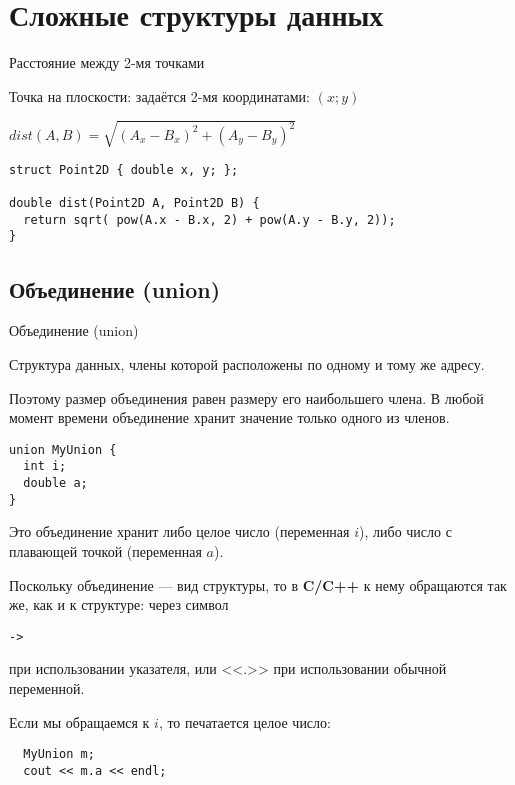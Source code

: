 \section{Сложные структуры данных}

\begin{frame}[t,fragile]{Расстояние между 2-мя точками}

Точка на плоскости: задаётся 2-мя координатами: $(x; y)$

$dist(A, B) = \sqrt{{(A_x - B_x)^2} + {(A_y - B_y)^2}}$

\begin{lstlisting}
struct Point2D { double x, y; };

double dist(Point2D A, Point2D B) {
  return sqrt( pow(A.x - B.x, 2) + pow(A.y - B.y, 2));
}
\end{lstlisting}
\end{frame}

\subsection{Объединение (union)}

\begin{frame}[t,fragile]{Объединение (union)}

Структура данных, 
члены которой расположены по одному и тому же адресу.
 
Поэтому размер объединения равен размеру его наибольшего члена. 
В любой момент времени объединение хранит значение только одного из членов.

\begin{lstlisting}
union MyUnion {
  int i;
  double a;
}
\end{lstlisting}

Это объединение хранит либо целое число (переменная $i$), 
либо число с плавающей точкой (переменная $a$). 

Поскольку объединение --- вид структуры, то в 
\textbf{C/C++} к нему обращаются так же, 
как и к структуре: через символ 
\begin{lstlisting}
-> 
\end{lstlisting}
при использовании указателя, 
или <<.>> при использовании обычной переменной. 

Если мы обращаемся к $i$, то печатается целое число:

\begin{lstlisting}
  MyUnion m;
  cout << m.a << endl;
\end{lstlisting}
\end{frame}

